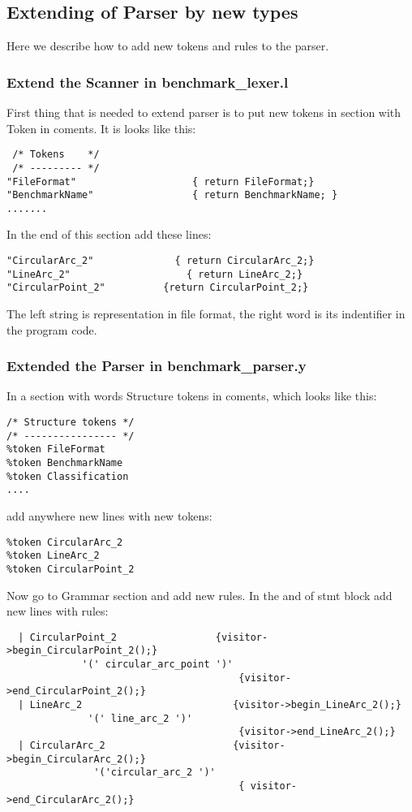 \documentclass[10pt]{article}
\begin{document}
\subsection{Extending of Parser by new types}
Here we describe how to add new tokens and rules to the parser.
\subsubsection{Extend the Scanner in benchmark\_lexer.l}
First thing that is needed to extend parser is to put new tokens in section with Token in coments. It is looks  like this:

\begin{verbatim}
 /* Tokens    */
 /* --------- */
"FileFormat"                    { return FileFormat;}
"BenchmarkName"                 { return BenchmarkName; }
.......
\end{verbatim}

In the end of this section add these lines:

\begin{verbatim}
"CircularArc_2"              { return CircularArc_2;} 
"LineArc_2"                    { return LineArc_2;} 
"CircularPoint_2"          {return CircularPoint_2;} 
\end{verbatim}

The left string is representation in file format, the right word is its indentifier in the program code.
\subsubsection{Extended the Parser in benchmark\_parser.y}
 In a section with words Structure tokens in coments, which looks like this:

\begin{verbatim}
/* Structure tokens */
/* ---------------- */
%token FileFormat
%token BenchmarkName
%token Classification
....
\end{verbatim}
 add anywhere new lines with new tokens:
\begin{verbatim}
%token CircularArc_2
%token LineArc_2
%token CircularPoint_2

\end{verbatim}

Now go to Grammar section and add new rules. In the and of stmt block add new lines with rules:

\begin{verbatim}
  | CircularPoint_2                 {visitor->begin_CircularPoint_2();}
             '(' circular_arc_point ')'
                                        {visitor->end_CircularPoint_2();}
  | LineArc_2                          {visitor->begin_LineArc_2();}
              '(' line_arc_2 ')'
                                        {visitor->end_LineArc_2();}
  | CircularArc_2                      {visitor->begin_CircularArc_2();} 
               '('circular_arc_2 ')'
                                        { visitor->end_CircularArc_2();}
\end{verbatim}
\end{document}
